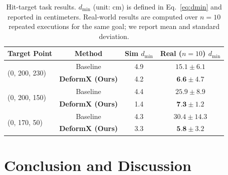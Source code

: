 \documentclass[letterpaper, 10 pt, conference]{ieeeconf}  %
\begin{document}
\begin{table}[t]
\centering
\small
\setlength{\tabcolsep}{3pt}
\begin{tabular}{lccc}
\toprule
\textbf{Target Point} &\textbf{Method} & \textbf{Sim} $d_{\min}$ & \textbf{Real ($n{=}10$)} $d_{\min}$ \\
\midrule
\multirow{2}{*}{(0, 200, 230)} & Baseline & 4.9 & $15.1 \pm 6.1$ \\ & \textbf{DeformX (Ours)} & 4.2 & $\textbf{6.6} \pm 4.7$ \\
\midrule
\multirow{2}{*}{(0, 200, 150)} & Baseline & 4.4 & $25.9 \pm 8.9$ \\ & \textbf{DeformX (Ours)} & 1.4 & $\textbf{7.3} \pm 1.2$ \\
\midrule
\multirow{2}{*}{(0, 170, 50)} & Baseline & 4.3 & $30.4 \pm 14.3$ \\ & \textbf{DeformX (Ours)} & 3.3 & $\textbf{5.8} \pm 3.2$ \\
\bottomrule
\end{tabular}
\caption{Hit-target task results. $d_{\min}$ (unit: cm) is defined in Eq.~\eqref{eq:dmin} and reported in centimeters. Real-world results are computed over $n{=}10$ repeated executions for the same goal; we report mean and standard deviation.}
\label{tab:rl_hit_target}
\end{table}



\section{Conclusion and Discussion}
\end{document}
